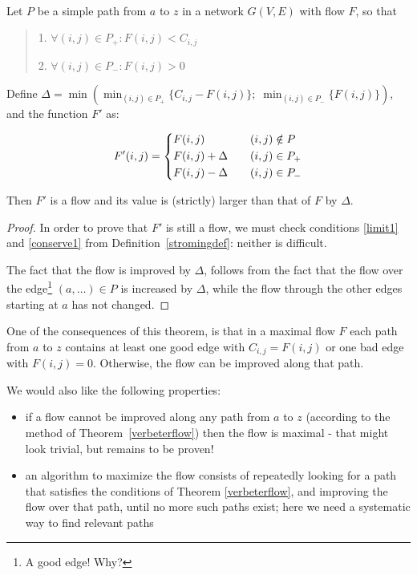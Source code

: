\begin{theorem}\label{verbeterflow}~\\
Let $P$ be a simple path from $a$ to $z$ in a network $G(V,E)$ with flow $F$, so that
\begin{verse}
1. $\forall (i,j) \in P_{+}: F(i,j) < C_{i,j}$

2. $\forall (i,j) \in P_{-}: F(i,j) > 0$
\end{verse}
Define $\Delta = \min\left(\min_{(i,j) \in P_{+}}
\{C_{i,j}-F(i,j)\};\; \min_{(i,j) \in P_{-}} \{F(i,j)\}\right)$, and the
function $F'$ as:

\begin{equation*}
F'(i,j) = \begin{dcases}
		F(i,j)  		   &\quad (i,j) \notin P\\
       F(i,j) + \Delta  &\quad (i,j) \in P_{+}\\
       F(i,j) - \Delta  &\quad (i,j) \in P_{-}
	\end{dcases}
\end{equation*}

Then $F'$ is a flow and its value is (strictly) larger than that of $F$ by $\Delta$.

\end{theorem}
\begin{proof} In order to prove that $F'$ is still a flow, we must check
conditions \ref{limit1} and \ref{conserve1} from
Definition~\ref{stromingdef}: neither is difficult.

The fact that the flow is improved by $\Delta$, follows from the fact
that the flow over the edge\footnote{A good edge! Why?} $(a,\hdots) \in P$ is
increased by $\Delta$, while the flow through the other edges starting
at $a$ has not changed. \end{proof}

One of the consequences of this theorem, is that in a maximal flow $F$
each path from $a$ to $z$ contains at least one good edge with
$C_{i,j} = F(i,j)$ or one bad edge with $F(i,j) = 0$. Otherwise, the
flow can be improved along that path.

We would also like the following properties:

\begin{itemize}
\item
if a flow cannot be improved along any path from $a$ to $z$ (according
to the method of Theorem~\ref{verbeterflow}) then the flow is maximal
- that might look trivial, but remains to be proven!
\item
an algorithm to maximize the flow consists of repeatedly looking for a
path that satisfies the conditions of Theorem \ref{verbeterflow},
and improving the flow over that path, until no more such paths exist;
here we need a systematic way to find relevant paths
\end{itemize}

